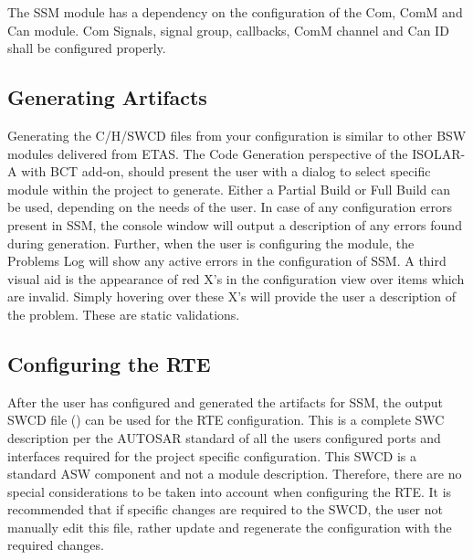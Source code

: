 The SSM module has a dependency on the configuration of the Com, ComM and Can module.
Com Signals, signal group, callbacks, ComM channel and Can ID shall be configured properly.

\subsection{Generating Artifacts}
Generating the C/H/SWCD files from your configuration is similar to other BSW modules delivered from ETAS.
The Code Generation perspective of the ISOLAR-A with BCT add-on, should present the user with a dialog to select specific module within the project to generate.
Either a Partial Build or Full Build can be used, depending on the needs of the user.
In case of any configuration errors present in SSM, the console window will output a description of any errors found during generation.
Further, when the user is configuring the module, the Problems Log will show any active errors in the configuration of SSM.
A third visual aid is the appearance of red X’s in the configuration view over items which are invalid.
Simply hovering over these X’s will provide the user a description of the problem.
These are static validations.

\subsection{Configuring the RTE}
After the user has configured and generated the artifacts for SSM, the output SWCD file \linebreak() can be used for the RTE configuration.
This is a complete SWC description per the AUTOSAR standard of all the users configured ports and interfaces required for the project specific configuration.
This SWCD is a standard ASW component and not a module description.
Therefore, there are no special considerations to be taken into account when configuring the RTE.
It is recommended that if specific changes are required to the SWCD, the user not manually edit this file, rather update and regenerate the configuration with the required changes.

